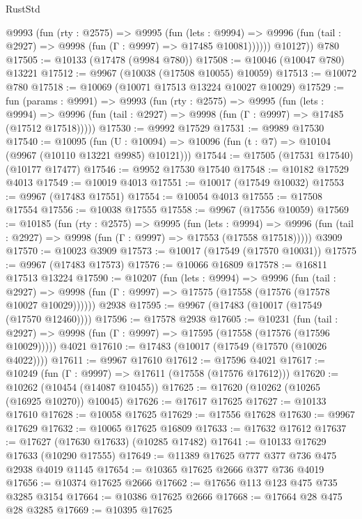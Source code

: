 \begin{lexlean}{RustStd}
\begin{coremodule}
{\begin{coremodule}
{{{{{{{{{{{{{{{{{{{{{{{{{{{{{{{{{{{{{{{{{{{{{{{{{{{{{{{{{{{{{{{{{{{{{{{{{{{{{{          @9993
            (fun (rty : @2575) =>
            @9995
              (fun (lets : @9994) =>
              @9996 (fun (tail : @2927) => @9998 (fun (Γ : @9997) => @17485 @10081))))))
        @10127))
    @780
@17505 := @10133 (@17478 (@9984 @780))
@17508 := @10046 (@10047 @780) @13221
@17512 := @9967 (@10038 (@17508 @10055) @10059)
@17513 := @10072 @780
@17518 := @10069 (@10071 @17513 @13224 @10027 @10029)
@17529 := fun (params : @9991) =>
  @9993
    (fun (rty : @2575) =>
    @9995
      (fun (lets : @9994) =>
      @9996 (fun (tail : @2927) => @9998 (fun (Γ : @9997) => @17485 (@17512 @17518)))))
@17530 := @9992 @17529
@17531 := @9989 @17530
@17540 := @10095
    (fun (U : @10094) => @10096 (fun (t : @7) => @10104 (@9967 (@10110 @13221 @9985) @10121)))
@17544 := @17505 (@17531 @17540) (@10177 @17477)
@17546 := @9952 @17530 @17540
@17548 := @10182 @17529 @4013
@17549 := @10019 @4013
@17551 := @10017 (@17549 @10032)
@17553 := @9967 (@17483 @17551)
@17554 := @10054 @4013
@17555 := @17508 @17554
@17556 := @10038 @17555
@17558 := @9967 (@17556 @10059)
@17569 := @10185
    (fun (rty : @2575) =>
    @9995
      (fun (lets : @9994) =>
      @9996 (fun (tail : @2927) => @9998 (fun (Γ : @9997) => @17553 (@17558 @17518)))))
    @3909
@17570 := @10023 @3909
@17573 := @10017 (@17549 (@17570 @10031))
@17575 := @9967 (@17483 @17573)
@17576 := @10066 @16809
@17578 := @16811 @17513 @13224
@17590 := @10207
    (fun (lets : @9994) =>
    @9996
      (fun (tail : @2927) =>
      @9998 (fun (Γ : @9997) => @17575 (@17558 (@17576 (@17578 @10027 @10029))))))
    @2938
@17595 := @9967 (@17483 (@10017 (@17549 (@17570 @12460))))
@17596 := @17578 @2938
@17605 := @10231
    (fun (tail : @2927) => @9998 (fun (Γ : @9997) => @17595 (@17558 (@17576 (@17596 @10029)))))
    @4021
@17610 := @17483 (@10017 (@17549 (@17570 (@10026 @4022))))
@17611 := @9967 @17610
@17612 := @17596 @4021
@17617 := @10249 (fun (Γ : @9997) => @17611 (@17558 (@17576 @17612)))
@17620 := @10262 (@10454 (@14087 @10455))
@17625 := @17620 (@10262 (@10265 (@16925 @10270)) @10045)
@17626 := @17617 @17625
@17627 := @10133 @17610
@17628 := @10058 @17625
@17629 := @17556 @17628
@17630 := @9967 @17629
@17632 := @10065 @17625 @16809
@17633 := @17632 @17612
@17637 := @17627 (@17630 @17633) (@10285 @17482)
@17641 := @10133 @17629 @17633 (@10290 @17555)
@17649 := @11389 @17625 @777 @377 @736 @475 @2938 @4019 @1145
@17654 := @10365 @17625 @2666 @377 @736 @4019
@17656 := @10374 @17625 @2666
@17662 := @17656 @113 @123 @475 @735 @3285 @3154
@17664 := @10386 @17625 @2666
@17668 := @17664 @28 @475 @28 @3285
@17669 := @10395 @17625
}}}}}}}}}}}}}}}}}}}}}}}}}}}}}}}}}}}}}}}}}}}}}}}}}}}}}}}}}}}}}}}}}}}}}}}}}}}}}}
\end{coremodule}}
\end{coremodule}
\end{lexlean}

